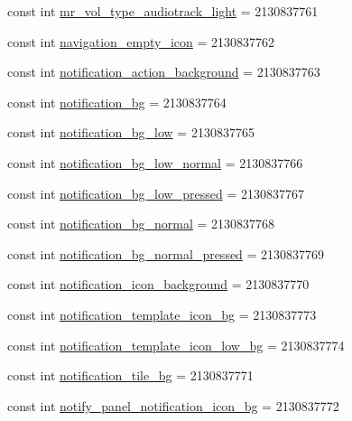 \begin{DoxyCompactItemize}
\item 
const int \mbox{\hyperlink{class_f_w_p_s___app_1_1_droid_1_1_resource_1_1_drawable_a634d8805c48f7f3d66d7aa90db806d6c}{mr\+\_\+vol\+\_\+type\+\_\+audiotrack\+\_\+light}} = 2130837761
\item 
const int \mbox{\hyperlink{class_f_w_p_s___app_1_1_droid_1_1_resource_1_1_drawable_a9c5a700370e7fa92f1687268231d8851}{navigation\+\_\+empty\+\_\+icon}} = 2130837762
\item 
const int \mbox{\hyperlink{class_f_w_p_s___app_1_1_droid_1_1_resource_1_1_drawable_a9d500a14895b680c0e3475f583ac85ac}{notification\+\_\+action\+\_\+background}} = 2130837763
\item 
const int \mbox{\hyperlink{class_f_w_p_s___app_1_1_droid_1_1_resource_1_1_drawable_af13ebc300f10afd4edf625f4ad498dd8}{notification\+\_\+bg}} = 2130837764
\item 
const int \mbox{\hyperlink{class_f_w_p_s___app_1_1_droid_1_1_resource_1_1_drawable_a62363ae951d5c790bf1b373695228ae3}{notification\+\_\+bg\+\_\+low}} = 2130837765
\item 
const int \mbox{\hyperlink{class_f_w_p_s___app_1_1_droid_1_1_resource_1_1_drawable_a05b23a15661b3baf7c20c85def22c51e}{notification\+\_\+bg\+\_\+low\+\_\+normal}} = 2130837766
\item 
const int \mbox{\hyperlink{class_f_w_p_s___app_1_1_droid_1_1_resource_1_1_drawable_a4da536d30bbe5ad2c1246a32017bfed9}{notification\+\_\+bg\+\_\+low\+\_\+pressed}} = 2130837767
\item 
const int \mbox{\hyperlink{class_f_w_p_s___app_1_1_droid_1_1_resource_1_1_drawable_ace1e00df6d7c070457155d59fa8432f2}{notification\+\_\+bg\+\_\+normal}} = 2130837768
\item 
const int \mbox{\hyperlink{class_f_w_p_s___app_1_1_droid_1_1_resource_1_1_drawable_aa09a23f1e08d206922133da44ac9580f}{notification\+\_\+bg\+\_\+normal\+\_\+pressed}} = 2130837769
\item 
const int \mbox{\hyperlink{class_f_w_p_s___app_1_1_droid_1_1_resource_1_1_drawable_a3903403b34d32c5ebebced642fa70d4e}{notification\+\_\+icon\+\_\+background}} = 2130837770
\item 
const int \mbox{\hyperlink{class_f_w_p_s___app_1_1_droid_1_1_resource_1_1_drawable_a924b895ee267303f9766732bf4428129}{notification\+\_\+template\+\_\+icon\+\_\+bg}} = 2130837773
\item 
const int \mbox{\hyperlink{class_f_w_p_s___app_1_1_droid_1_1_resource_1_1_drawable_a6e5d630043aaf3af1451f014d001a8cc}{notification\+\_\+template\+\_\+icon\+\_\+low\+\_\+bg}} = 2130837774
\item 
const int \mbox{\hyperlink{class_f_w_p_s___app_1_1_droid_1_1_resource_1_1_drawable_af894fe8c9ee981dbf7063308d1a4899e}{notification\+\_\+tile\+\_\+bg}} = 2130837771
\item 
const int \mbox{\hyperlink{class_f_w_p_s___app_1_1_droid_1_1_resource_1_1_drawable_a409d8b5d7402be754d642de8e3ffbbcc}{notify\+\_\+panel\+\_\+notification\+\_\+icon\+\_\+bg}} = 2130837772
\end{DoxyCompactItemize}
